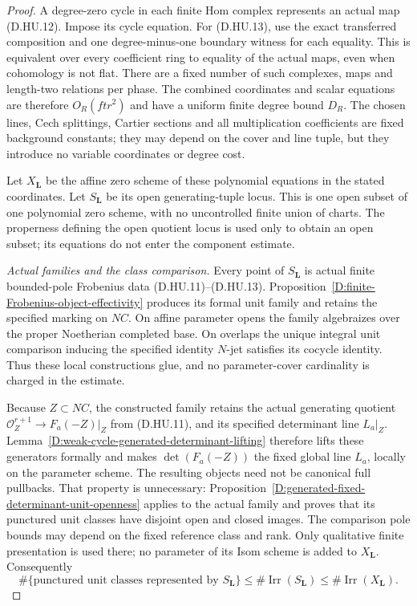 \begin{proof}
A degree-zero cycle in each finite Hom complex represents
an actual map (D.HU.12). Impose its cycle equation.
For (D.HU.13), use the exact transferred composition and
one degree-minus-one boundary witness for each equality.
This is equivalent over every coefficient ring to equality
of the actual maps, even when cohomology is not flat.
There are a fixed number of such complexes, maps and
length-two relations per phase. The combined coordinates
and scalar equations are therefore $O_R(ftr^2)$ and
have a uniform finite degree bound $D_R$.
The chosen lines, Cech splittings, Cartier sections and
all multiplication coefficients are fixed background
constants; they may depend on the cover and line tuple,
but they introduce no variable coordinates or degree cost.

Let $X_{\boldsymbol L}$ be the affine zero scheme of
these polynomial equations in the stated coordinates.
Let $S_{\boldsymbol L}$ be its open generating-tuple
locus. This is one open subset of one polynomial zero
scheme, with no uncontrolled finite union of charts.
The properness defining the open quotient locus is used
only to obtain an open subset; its equations do not enter
the component estimate.

\emph{Actual families and the class comparison.}
Every point of $S_{\boldsymbol L}$ is actual finite
bounded-pole Frobenius data (D.HU.11)--(D.HU.13).
Proposition~\ref{D:finite-Frobenius-object-effectivity}
produces its formal unit family and retains the specified
marking on $NC$. On affine parameter opens the family
algebraizes over the proper Noetherian completed base.
On overlaps the unique integral unit comparison inducing
the specified identity $N$-jet satisfies its cocycle
identity. Thus these local constructions glue, and no
parameter-cover cardinality is charged in the estimate.

Because $Z\subset NC$, the constructed family retains
the actual generating quotient
$\mathcal O_{Z}^{r+1}\to F_a(-Z)|_Z$ from (D.HU.11),
and its specified determinant line $L_a|_Z$.
Lemma~\ref{D:weak-cycle-generated-determinant-lifting}
therefore lifts these generators formally and makes
$\det(F_a(-Z))$ the fixed global line $L_a$, locally on
the parameter scheme. The resulting objects need not
be canonical full pullbacks. That property is unnecessary:
Proposition~\ref{D:generated-fixed-determinant-unit-openness}
applies to the actual family and proves that its punctured
unit classes have disjoint open and closed images.
The comparison pole bounds may depend on the fixed
reference class and rank. Only qualitative finite
presentation is used there; no parameter of its Isom
scheme is added to $X_{\boldsymbol L}$.
Consequently
\[
 \#\{\text{punctured unit classes represented by }
                       S_{\boldsymbol L}\}
          \le\#\operatorname{Irr}(S_{\boldsymbol L})
          \le\#\operatorname{Irr}(X_{\boldsymbol L}).    \tag{D.HU.16}
\]


\end{proof}
